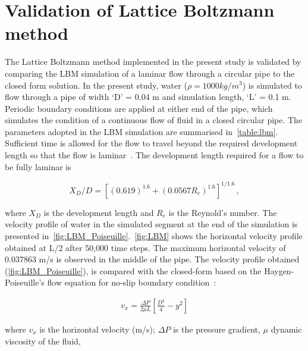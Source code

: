
\section{Validation of Lattice Boltzmann method}

The Lattice Boltzmann method implemented in the present study is validated by 
comparing the LBM simulation of a laminar flow through a circular pipe to 
the closed form solution. In the present study, water ($\rho=1000 kg/m^{3}$) is 
simulated to flow through a pipe of width `D' = 0.04 m and 
simulation length, `L' = 0.1 m. Periodic boundary conditions are applied at 
either end of the pipe, which simulates the condition of a continuous flow of 
fluid in a closed circular pipe. The parameters adopted in the LBM simulation 
are summarised in~\cref{table:lbm}. Sufficient time is allowed for the flow to 
travel beyond the required development length so that the flow is 
laminar~\citet{Durst2005}. The development length required for a flow to 
be fully laminar is

\begin{equation}
X_{D}/D=[(0.619)^{1.6}+(0.0567 R_{e})^{1.6}]^{1/1.6} \,,
\end{equation}

\noindent where $X_{D}$ is the development length and $R_{e}$ is the Reynold's 
number. The velocity profile of water in the simulated segment at the end of 
the simulation is presented in~\cref{fig:LBM_Poiseuille}.~\cref{fig:LBM} shows 
the horizontal velocity profile obtained at L/2 after 50,000 time steps. The 
maximum horizontal velocity of 0.037863 m/s is observed in the middle of the 
pipe. The velocity profile obtained (\cref{fig:LBM_Poiseuille}), is compared 
with the closed-form based on the Haygen-Poiseuille's flow equation for no-slip 
boundary condition~\citep{Willis2008}:

\begin{align}
\mathit{v}_{\mathit{x}}=\frac{\Delta P}{2 \mu L} [\frac{D^{2}}{4}-y^{2}]
\end{align}

where $v_{x}$ is the horizontal velocity (m/s); $\Delta P$ is the pressure 
gradient, $\mu$ dynamic viscosity of the fluid, 

